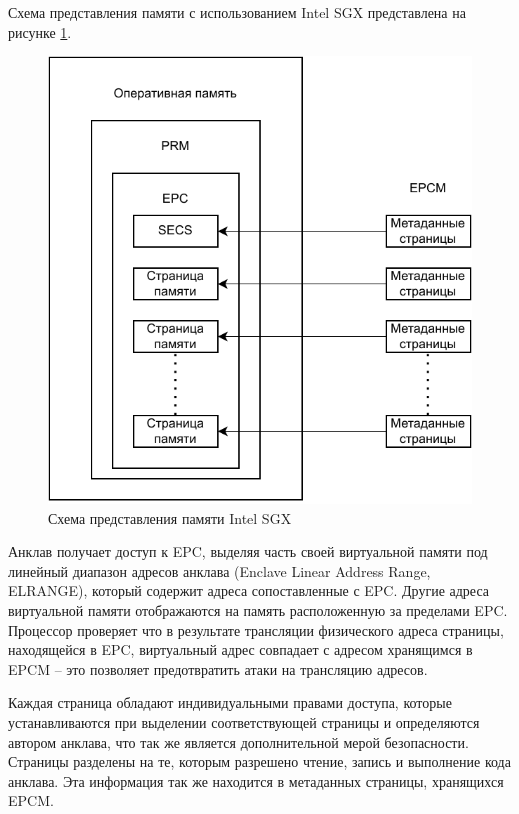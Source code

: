 Схема представления памяти с использованием Intel SGX представлена на рисунке \ref{fig:intel-prm}.

\begin{figure}[h!]
	\centering
	\includegraphics[width=\textwidth]{img/intel-prm.pdf}
	\caption{Схема представления памяти Intel SGX}
	\label{fig:intel-prm}
\end{figure}

Анклав получает доступ к EPC, выделяя часть своей виртуальной памяти под линейный диапазон адресов анклава (Enclave Linear Address Range,\\ELRANGE), который содержит адреса сопоставленные с EPC. Другие адреса виртуальной памяти отображаются на память расположенную за пределами EPC. Процессор проверяет что в результате трансляции физического адреса страницы, находящейся в EPC, виртуальный адрес совпадает с адресом хранящимся в EPCM -- это позволяет предотвратить атаки на трансляцию адресов.

Каждая страница обладают индивидуальными правами доступа, которые устанавливаются при выделении соответствующей страницы и определяются автором анклава, что так же является дополнительной мерой безопасности. Страницы разделены на те, которым разрешено чтение, запись и выполнение кода анклава. Эта информация так же находится в метаданных страницы, хранящихся EPCM.

